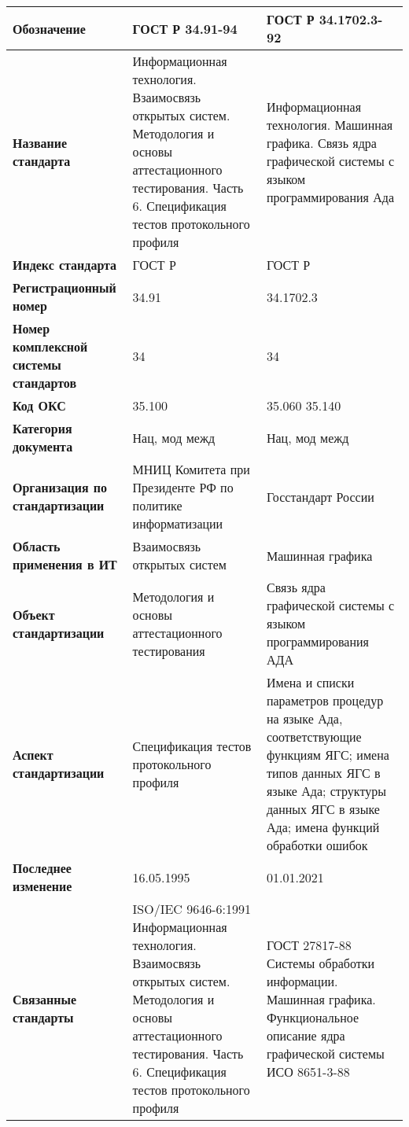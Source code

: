 \begin{table}[h!tp]
	\small
	\centering
	\caption{}
	\label{table:national:international:mod}
	\begin{tabular}{|p{10em}|p{14em}|p{14em}|}
		\hline
		\textbf{Обозначение}
			& \textbf{ГОСТ Р 34.91-94}
			& \textbf{ГОСТ Р 34.1702.3-92} \\ \hline
		\textbf{Название стандарта}
			& Информационная технология. Взаимосвязь открытых систем. Методология и основы аттестационного тестирования. Часть 6. Спецификация тестов протокольного профиля
			& Информационная технология. Машинная графика. Связь ядра графической системы с языком программирования Ада \\ \hline
		\textbf{Индекс стандарта}
			& ГОСТ Р & ГОСТ Р \\ \hline
		\textbf{Регистрационный номер}
			& 34.91 & 34.1702.3 \\ \hline
		\textbf{Номер комплексной системы стандартов}
			& 34 & 34 \\ \hline
		\textbf{Код ОКС}
			& 35.100 & 35.060 35.140 \\ \hline
		\textbf{Категория документа}
			& Нац, мод межд & Нац, мод межд \\ \hline
		\textbf{Организация по стандартизации}
			& МНИЦ Комитета при Президенте РФ по политике информатизации
			& Госстандарт России  \\ \hline
		\textbf{Область применения в ИТ}
			& Взаимосвязь открытых систем
			& Машинная графика \\ \hline
		\textbf{Объект стандартизации}
			& Методология и основы аттестационного тестирования
			& Связь ядра графической системы с языком программирования АДА \\ \hline
		\textbf{Аспект стандартизации}
			& Спецификация тестов протокольного профиля
			& Имена и списки параметров процедур на языке Ада, соответствующие функциям ЯГС; имена типов данных ЯГС в языке Ада; структуры данных ЯГС в языке Ада; имена функций обработки ошибок \\ \hline
		\textbf{Последнее изменение}
			& 16.05.1995
			& 01.01.2021 \\ \hline
		\textbf{Связанные стандарты}
			& ISO/IEC 9646-6:1991 Информационная технология. Взаимосвязь открытых систем. Методология и основы аттестационного тестирования. Часть 6. Спецификация тестов протокольного профиля
			& ГОСТ 27817-88 Системы обработки информации. Машинная графика. Функциональное описание ядра графической системы ИСО 8651-3-88 \\ \hline
	\end{tabular}
\end{table}

